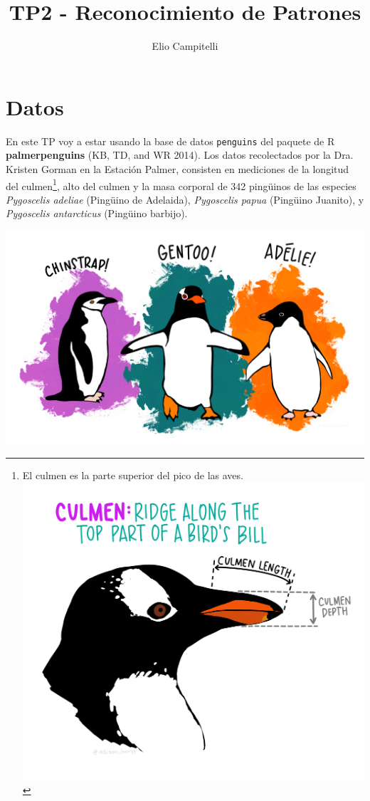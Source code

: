 \documentclass[]{tufte-handout}
\title{TP2 - Reconocimiento de Patrones}
\author{Elio Campitelli}
\date{}
\begin{document}
\maketitle




\hypertarget{datos}{%
\section{Datos}\label{datos}}

En este TP voy a estar usando la base de datos \texttt{penguins} del paquete de R \textbf{palmerpenguins} (KB, TD, and WR 2014). Los datos recolectados por la Dra. Kristen Gorman en la Estación Palmer, consisten en mediciones de la longitud del culmen\footnote{El culmen es la parte superior del pico de las aves. \includegraphics{culmen_depth}}, alto del culmen y la masa corporal de 342 pingüinos de las especies \emph{Pygoscelis adeliae} (Pingüino de Adelaida), \emph{Pygoscelis papua} (Pingüino Juanito), y \emph{Pygoscelis antarcticus} (Pingüino barbijo).

\begin{center}\includegraphics[width=0.8\linewidth]{penguins} \end{center}
\end{document}
